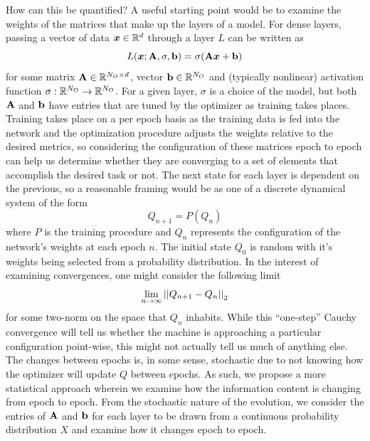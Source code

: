 How can this be quantified? A useful starting point would be to examine the weights of
the matrices that make up the layers of a model. For dense layers, passing a vector of 
data $\boldsymbol{x} \in \mathbb{R}^{d}$ through a layer $L$ can be written as 
\begin{equation}
    L(\boldsymbol{x}; {\bf A}, \sigma, {\bf b}) = \sigma({\bf A}\boldsymbol{x} + {\bf b})
\end{equation}
for some matrix ${\bf A} \in \mathbb{R}^{N_O\times d}$, vector ${\bf b} \in \mathbb{R}^{N_O}$ and (typically nonlinear)
activation function $\sigma: \mathbb{R}^{N_O} \to \mathbb{R}^{N_O}$. For a given layer, $\sigma$ is a choice of the 
model, but both ${\bf A}$ and ${\bf b}$ have entries that are tuned by the 
optimizer as training takes places. Training takes place on a per epoch basis as the training data 
is fed into the network and the optimization procedure adjusts the weights relative to the desired 
metrics, so considering the configuration of these matrices epoch to epoch can help us 
determine whether they are converging to a set of elements that accomplish the desired 
task or not. The next state for each layer is dependent on the previous, so a reasonable 
framing would be as one of a discrete dynamical system of the form
\begin{equation}
    Q_{n+1} = P(Q_n)
\end{equation}
where $P$ is the training procedure and $Q_n$ represents the configuration of the network's
weights at each epoch $n$. The initial state $Q_0$ is random with it's weights being
selected from a probability distribution. In the interest of examining 
convergences, one might consider the following limit 
\begin{equation}
    \lim_{n\to\infty} \left|\left|Q_{n+1} - Q_n\right|\right|_2    
\end{equation}
for some two-norm on the space that $Q_n$ inhabits. While this ``one-step'' Cauchy 
convergence will tell us whether the machine is approaching a particular configuration
point-wise, this might not actually tell us much of anything else. The changes between 
epochs is, in some sense, stochastic due to not knowing how the optimizer will update $Q$
between epochs. As such, we propose a more statistical approach wherein we examine how the
information content is changing from epoch to epoch. From the stochastic nature of the 
evolution, we consider the entries of ${\bf A}$ and ${\bf b}$ for each layer to be drawn from a continuous 
probability distribution $X$ and examine how it changes epoch to epoch. 


